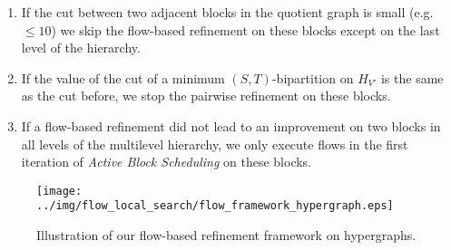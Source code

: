 \begin{enumerate}
\item If the cut between two adjacent blocks in the quotient graph is small (e.g. $\le 10$) we
      skip the flow-based refinement on these blocks except on the last level of the hierarchy.
\item If the value of the cut of a minimum $(S,T)$-bipartition on $H_{V'}$ is the same 
      as the cut before, we stop the pairwise refinement on these blocks.
\item If a flow-based refinement did not lead to an improvement on two blocks in all levels
      of the multilevel hierarchy, we only execute flows in the first iteration of 
      \emph{Active Block Scheduling} on these blocks.
\end{enumerate}

\begin{figure}
\centering 
\texttt{[image: ../img/flow\_local\_search/flow\_framework\_hypergraph.eps]}
\caption{Illustration of our flow-based refinement framework on hypergraphs.}
\label{img:flow_framework}
\end{figure} 